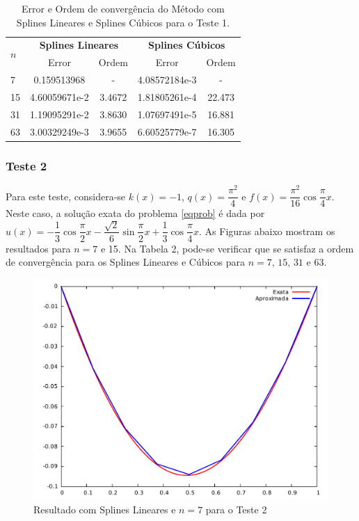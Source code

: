 \documentclass[12pt,a4paper]{report}
\begin{document}
\begin{table}[h!]
\caption{\label{tabla4} Error e Ordem de convergência do Método com Splines Lineares e Splines Cúbicos para o Teste 1.}
\centering
  \begin{tabular}{l|cc|cc}
    \hline
    \hline
    \multirow{2}{*}{\textbf{$n$}} &
      \multicolumn{2}{c}{\textbf{Splines Lineares}} &\multicolumn{2}{c}{\textbf{Splines Cúbicos}} \\
    &\multicolumn{1}{c|}{Error} & \multicolumn{1}{c|}{Ordem} & \multicolumn{1}{c|}{Error} & \multicolumn{1}{c}{Ordem}\\
    \hline
    \hline
	7   & 0.159513968 & - & 4.08572184e-3  & - \\
	15 & 4.60059671e-2 & 3.4672 & 1.81805261e-4 & 22.473\\
	31 & 1.19095291e-2 & 3.8630 & 1.07697491e-5 & 16.881\\
	63 & 3.00329249e-3 & 3.9655 & 6.60525779e-7 & 16.305\\
    \hline
    \hline
  \end{tabular}
\end{table}

\subsubsection*{Teste 2} Para este teste, considera-se $k(x)=-1$, $q(x) = \dfrac{\pi^2}{4}$ e $f(x)=\dfrac{\pi^2}{16}\cos\dfrac{\pi}{4}x$. Neste caso, a solução exata do problema \eqref{eqprob} é dada por $u(x)=-\dfrac{1}{3}\cos\dfrac{\pi}{2}x - \dfrac{\sqrt{2}}{6}\sin\dfrac{\pi}{2}x + \dfrac{1}{3}\cos\dfrac{\pi}{4}x$. As Figuras abaixo mostram os resultados para $n=7$ e 15. Na Tabela 2, pode-se verificar que se satisfaz a ordem de convergência para os Splines Lineares e Cúbicos para $n=7,\, 15,\, 31$ e 63.	

\begin{figure}[htb]
\centering
\includegraphics[width=0.8\linewidth]{t2splin7.pdf}
\caption{\label{splin}Resultado com Splines Lineares e $n=7$ para o Teste 2}
\end{figure}
\end{document}
